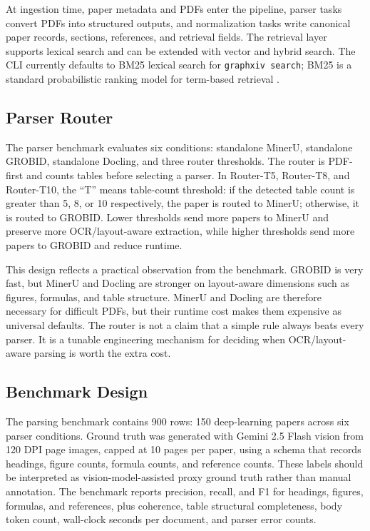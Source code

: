 \documentclass[10pt]{article}
\begin{document}
At ingestion time, paper metadata and PDFs enter the pipeline, parser tasks convert PDFs into structured outputs, and normalization tasks write canonical paper records, sections, references, and retrieval fields. The retrieval layer supports lexical search and can be extended with vector and hybrid search. The CLI currently defaults to BM25 lexical search for \texttt{graphxiv search}; BM25 is a standard probabilistic ranking model for term-based retrieval \citep{robertson2009bm25}.

\subsection{Parser Router}

The parser benchmark evaluates six conditions: standalone MinerU, standalone GROBID, standalone Docling, and three router thresholds. The router is PDF-first and counts tables before selecting a parser. In Router-T5, Router-T8, and Router-T10, the ``T'' means table-count threshold: if the detected table count is greater than 5, 8, or 10 respectively, the paper is routed to MinerU; otherwise, it is routed to GROBID. Lower thresholds send more papers to MinerU and preserve more OCR/layout-aware extraction, while higher thresholds send more papers to GROBID and reduce runtime.

This design reflects a practical observation from the benchmark. GROBID is very fast, but MinerU and Docling are stronger on layout-aware dimensions such as figures, formulas, and table structure. MinerU and Docling are therefore necessary for difficult PDFs, but their runtime cost makes them expensive as universal defaults. The router is not a claim that a simple rule always beats every parser. It is a tunable engineering mechanism for deciding when OCR/layout-aware parsing is worth the extra cost.

\subsection{Benchmark Design}

The parsing benchmark contains 900 rows: 150 deep-learning papers across six parser conditions. Ground truth was generated with Gemini 2.5 Flash vision from 120 DPI page images, capped at 10 pages per paper, using a schema that records headings, figure counts, formula counts, and reference counts. These labels should be interpreted as vision-model-assisted proxy ground truth rather than manual annotation. The benchmark reports precision, recall, and F1 for headings, figures, formulas, and references, plus coherence, table structural completeness, body token count, wall-clock seconds per document, and parser error counts.
\end{document}
